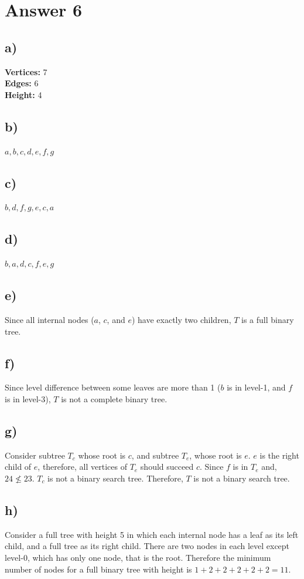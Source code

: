 \documentclass[11pt]{article}
\begin{document}
\section*{Answer 6}
\subsection*{a)}
\textbf{Vertices:} 7\\
\textbf{Edges:} 6\\
\textbf{Height:} 4
\subsection*{b)}
$a,b,c,d,e,f,g$
\subsection*{c)}
$b,d,f,g,e,c,a$
\subsection*{d)}
$b,a,d,c,f,e,g$
\subsection*{e)}
Since all internal nodes ($a$, $c$, and $e$) have exactly two children, $T$ is a full binary tree.
\subsection*{f)}
Since level difference between some leaves are more than 1 ($b$ is in level-1, and $f$ is in level-3), $T$ is not a complete binary tree.
\subsection*{g)}
Consider subtree $T_c$ whose root is $c$, and subtree $T_e$, whose root is $e$. $e$ is the right child of $e$, therefore, all vertices of $T_e$ should succeed $c$. Since $f$ is in $T_e$ and, $24 \not\leq 23$. $T_c$ is not a binary search tree. Therefore, $T$ is not a binary search tree.
\subsection*{h)}
Consider a full tree with height 5 in which each internal node has a leaf as its left child, and a full tree as its right child. There are two nodes in each level except level-0, which has only one node, that is the root. Therefore the minimum number of nodes for a full binary tree with height is $1 + 2 + 2 + 2 + 2 + 2 = 11$.
    
\end{document}

